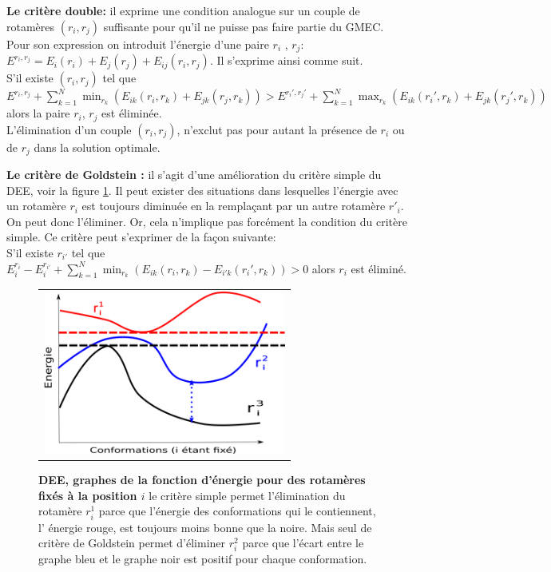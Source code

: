 \textbf{Le critère double:} il exprime une condition analogue sur un couple de rotamères $(r_i,r_j)$ suffisante pour qu'il ne puisse pas faire partie du GMEC. Pour son expression on introduit l'énergie d'une paire $r_i$ , $r_j$: $E^{r_i,r_j} = E_i(r_i) + E_j(r_j) + E_{ij}(r_i,r_j)$. Il s'exprime ainsi comme suit.\\
S'il existe $(r_i,r_j)$ tel que\\
$E^{r_i,r_j} + \sum_{k=1}^N \min_{r_k} (E_{ik}(r_i,r_k) + E_{jk}(r_j,r_k)) >  E^{r_i',r_j'} + \sum_{k=1}^N \max_{r_k} (E_{ik}(r_i',r_k) + E_{jk}(r_j',r_k))$ \\
alors la paire $r_i$, $r_j$ est éliminée.\\
L'élimination d'un couple $(r_i,r_j)$, n'exclut pas pour autant la présence de $r_i$ ou de $r_j$ dans la solution optimale. 

\textbf{Le critère de Goldstein \cite{Goldstein94}:} il s'agit d'une amélioration du critère simple du DEE, voir la figure \ref{fig:DEE}. Il peut exister des situations dans lesquelles l'énergie avec un rotamère $r_i$  est toujours diminuée en la remplaçant par un autre rotamère $r'_i$. On peut donc l'éliminer. Or, cela n'implique pas forcément la condition du critère simple. Ce critère peut s'exprimer de la façon suivante:\\
S'il existe $r_{i'}$ tel que $E_i^{r_i} - E_i^{r_{i'}}+ \sum_{k=1}^N \min_{r_k} (E_{ik}(r_i,r_k) - E_{i'k}(r_i',r_k)) > 0$ alors $r_i$ est éliminé.

   \begin{figure}[!htbp]
     \centering
     \begin{tabular}{c}
       \includegraphics[width=8cm]{figure/DEE.png} &
     \end{tabular}
     
     \caption{\textbf{DEE, graphes de la fonction d'énergie pour des rotamères fixés à la position $i$} le critère simple permet l'élimination du rotamère $r^1_i$ parce que l'énergie des conformations qui le contiennent, l' énergie rouge, est toujours moins bonne que la noire. Mais seul de critère de Goldstein permet d'éliminer $r^2_i$ parce que l'écart entre le graphe bleu et le graphe noir est positif pour chaque conformation.}
\label{fig:DEE}
   \end{figure}

